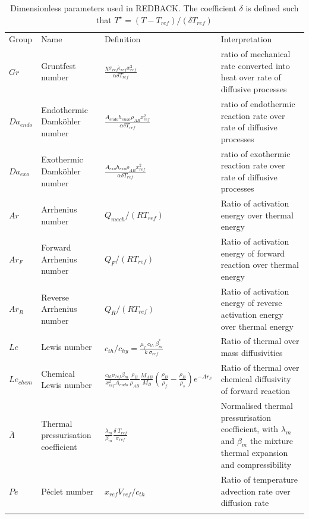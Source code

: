 \documentclass[]{scrreprt}
\newcommand{\redback}{{REDBACK}}
\begin{document}
\begin{table}
  \caption{Dimensionless parameters used in \redback{}. The coefficient $\delta$ is defined
such that $T^{\star} = (T-T_{ref})/(\delta T_{ref})$}
\label{tab:dimensionless_nbs}
\begin{tabular}{@{} l p{} l p{} @{}}
\hline\noalign{\smallskip}
Group & Name & Definition & Interpretation \\
\noalign{\smallskip}\hline\noalign{\smallskip}
$Gr$ & Gruntfest number & $\frac{\chi\sigma_{ref}\dot{\epsilon}_{ref} x^2_{ref}}{\alpha \delta T_{ref}}$ & ratio of mechanical rate converted into heat over rate of diffusive processes \\
$Da_{endo}$ & Endothermic Damk\"{o}hler number & $\frac{A_{endo} h_{endo} \rho_{AB} x^2_{ref}}{\alpha \delta T_{ref}}$ & ratio of endothermic reaction rate over rate of diffusive processes \\
$Da_{exo}$ & Exothermic Damk\"{o}hler number & $\frac{A_{exo} h_{exo} \rho_{AB} x^2_{ref}}{\alpha \delta T_{ref}}$ & ratio of exothermic reaction rate over rate of diffusive processes \\
$Ar$ & Arrhenius number & $Q_{mech}/(R T_{ref})$ & Ratio of activation energy over thermal energy \\
$Ar_F$ & Forward Arrhenius number & $Q_F/(R T_{ref})$ & Ratio of activation energy of forward reaction over thermal energy \\
$Ar_R$ & Reverse Arrhenius number & $Q_R/(R T_{ref})$ & Ratio of activation energy of reverse activation energy over thermal energy \\
$Le$ & Lewis number & $c_{th}/c_{hy}=\frac{\mu_f\:c_{th}\:\beta^*_m}{k \: \sigma_{ref}}$ & Ratio of thermal over mass diffusivities \\
$Le_{chem}$ & Chemical Lewis number & $\frac{c_{th}\sigma_{ref}\beta_m }{x^2_{ref} A_{endo}}\frac{\rho_{B}}{\rho_{AB}} \frac{M_{AB}}{M_{B}} \left( \frac{\rho_B}{\rho_f} - \frac{\rho_B}{\rho_s}\right)e^{-Ar_F}$ & Ratio of thermal over chemical diffusivity of forward reaction \\
$\bar{\Lambda}$ & Thermal pressurisation coefficient & $\frac{\lambda_m}{\beta_m}\frac{\delta \:T_{ref}}{\sigma_{ref}}$ & Normalised thermal pressurisation coefficient, with $\lambda_m$ and $\beta_m$ the mixture thermal expansion and compressibility \\
$Pe$ & P\'{e}clet number & $x_{ref}V_{ref}/c_{th}$ & Ratio of temperature advection rate over diffusion rate \\
\noalign{\smallskip}\hline
\end{tabular}
\end{table}
\end{document}
